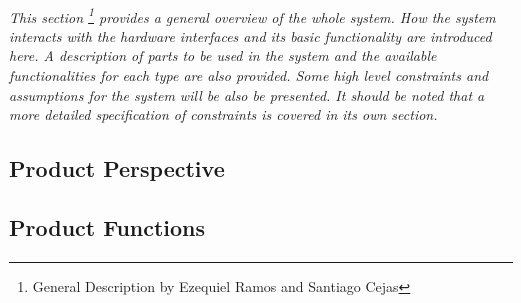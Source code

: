 \documentclass[12pt]{article}
\begin{document}
	\paragraph{}\textit{This section \footnote{General Description by Ezequiel Ramos and 
	Santiago Cejas} provides a general overview of the whole system. How the system interacts with 
	the hardware interfaces and its basic functionality are introduced here. A description of
	parts to be used in the system and the available functionalities for each type are also 
	provided. Some high level constraints and assumptions for the system will be also be presented.
	It should be noted that a more detailed specification of constraints is covered in its 
	own section.}
	
	\subsection{Product Perspective}
		\paragraph{} 

		\paragraph{} 
		
		
		\paragraph{} 
		\paragraph{} 	
		\paragraph{} 

	\subsection{Product Functions}
		\paragraph{} 
		
\end{document}

